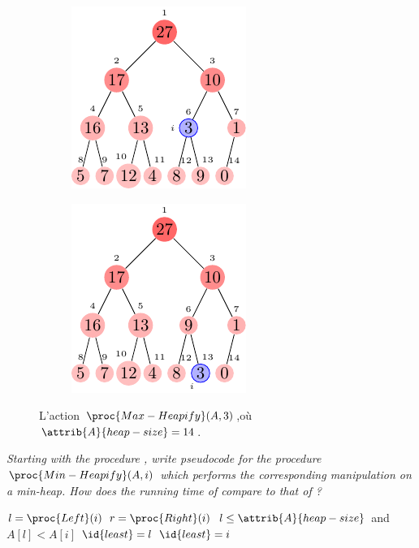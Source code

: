 \begin{description}
\begin{ex}
\begin{figure}[t]
        \begin{subfigure}[t]{.45\textwidth}
          \centering
          \includegraphics[scale=1.4]{img/6_2-1/6_2-1_2}
          \caption{}\label{fig:6_2-1_2}
        \end{subfigure}
        \begin{subfigure}[t]{.45\textwidth}
          \centering
          \includegraphics[scale=1.4]{img/6_2-1/6_2-1_3}
          \caption{}\label{fig:6_2-1_3}
        \end{subfigure}
        \caption{L'action $\proc{Max-Heapify}(A,3)$,o\`u $\attrib{A}{heap-size}= 14$.} 
        \label{fig:Heapify}
      \end{figure}
    \end{ex}
   \textit{Starting with the procedure , write pseudocode for the procedure $\proc{Min-Heapify}(A,i)$ which performs the corresponding manipulation on a min-heap. How does the running time of  compare to that of  ?}
    \begin{ex}
      \begin{codebox}
        \li $l = \proc{Left}(i)$
        \li $r = \proc{Right}(i)$
        \li \If $l \le \attrib{A}{heap-size}$ and $A[l] < A[i]$ \Do
        \li $\id{least} = l$        
        \li \Else $\id{least} = i$ \End

\end{codebox}
\end{ex}
\end{description}
